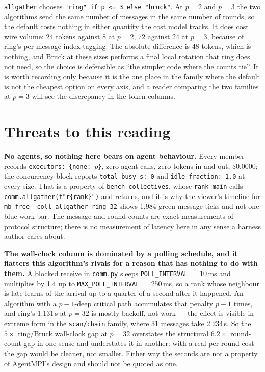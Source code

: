 \documentclass[11pt]{article}
\begin{document}
\texttt{allgather} chooses \texttt{"ring" if p <= 3 else "bruck"}. At $p=2$ and $p=3$ the two
algorithms send the same number of messages in the same number of rounds, so the default costs
nothing in either quantity the cost model tracks. It does cost wire volume: 24 tokens against 8 at
$p=2$, 72 against 24 at $p=3$, because of ring's per-message index tagging. The absolute
difference is 48 tokens, which is nothing, and Bruck at these sizes performs a final local
rotation that ring does not need, so the choice is defensible as ``the simpler code where the
counts tie''. It is worth recording only because it is the one place in the family where the
default is not the cheapest option on every axis, and a reader comparing the two families at
$p=3$ will see the discrepancy in the token columns.

\section{Threats to this reading}

\textbf{No agents, so nothing here bears on agent behaviour.} Every member records
\texttt{executors: \{none: $p$\}}, zero agent calls, zero tokens in and out, \$0.0000; the
concurrency block reports \texttt{total\_busy\_s: 0} and \texttt{idle\_fraction: 1.0} at every
size. That is a property of \texttt{bench\_\allowbreak collectives}, whose \texttt{rank\_main}
calls
\texttt{comm.allgather(f"r\{rank\}")} and returns, and it is why the viewer's timeline for
\texttt{mb-free\_\_coll-allgather-ring-32} shows 1{,}984 green message ticks and not one blue work
bar. The message and round counts are exact measurements of protocol structure; there is no
measurement of latency here in any sense a harness author cares about.

\textbf{The wall-clock column is dominated by a polling schedule, and it flatters this
algorithm's rivals for a reason that has nothing to do with them.} A blocked receive in
\texttt{comm.py} sleeps \texttt{POLL\_INTERVAL} $= 10$\,ms and multiplies by 1.4 up to
\texttt{MAX\_POLL\_INTERVAL} $= 250$\,ms, so a rank whose neighbour is late learns of the arrival
up to a quarter of a second after it happened. An algorithm with a $p-1$-deep critical path
accumulates that penalty $p-1$ times, and ring's 1.131\,s at $p=32$ is mostly backoff, not work
--- the effect is visible in extreme form in the \texttt{scan/chain} family, where 31 messages
take 2.234\,s. So the $5\times$ ring/Bruck wall-clock gap at $p=32$ overstates the structural
$6.2\times$ round-count gap in one sense and understates it in another: with a real per-round cost
the gap would be cleaner, not smaller. Either way the seconds are not a property of AgentMPI's
design and should not be quoted as one.
\end{document}
